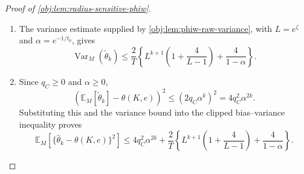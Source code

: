 \begin{proof}[Proof of \cref{obj:lem:radius-sensitive-phiw}]
\begin{enumerate}
\[
\theta(K,e)
=
\sum_s d_e(s)g_e(s)
=
\sum_s d_e(s)g_e^\circ(s).
\]
By the meaning of the target-policy stationary law used in \cref{obj:def:target-value}, \(d_e\) is invariant for \(P_e\).  Thus, for every function \(r_{\mathrm{test}}:\mathcal S\to\mathbb R\) and every integer \(m\ge0\),
\[
\sum_s d_e(s)r_{\mathrm{test}}(s)
=
\sum_s d_e(s)(P_e^m r_{\mathrm{test}})(s).
\]
Applying this identity with \(r_{\mathrm{test}}=g_e^\circ\) and \(m=k\) yields
\[
\sum_s d_e(s)g_e^\circ(s)
=
\sum_s d_e(s)\Psi_k(s).
\]
Combining the preceding displays,
\[
\mathbb E_M[\widetilde\theta_k]-\theta(K,e)
=
\sum_s \{d_b(s)-d_e(s)\}\Psi_k(s).
\]
For any function with oscillation at most \(2\alpha^k\),
\[
\left|
\sum_s \{d_b(s)-d_e(s)\}\Psi_k(s)
\right|
\le
2\alpha^k\,\|d_b-d_e\|_{\mathrm{TV}}.
\]
It remains to prove the stationary-law distance subclaim
\[
\|d_b-d_e\|_{\mathrm{TV}}\le q_C.
\]
This subclaim uses the pointwise comparison \(d_e(s)\le C d_b(s)\) from \cref{obj:ass:latent-stationary-overlap}.  Throughout this step,
\[
\|\mu-\eta\|_{\mathrm{TV}}
:=
\frac12\sum_{s\in\mathcal S}|\mu(s)-\eta(s)|
=
\sup_{B\subseteq\mathcal S}|\mu(B)-\eta(B)|
\]
for probability laws on the finite joint-state space.  With this convention, any two probability laws have total-variation distance at most \(1\), since
\[
\frac12\sum_s |\mu(s)-\eta(s)|
\le
\frac12\sum_s\{\mu(s)+\eta(s)\}=1.
\]
If \(C=1\), then \(d_e(s)\le d_b(s)\) for every \(s\), and the two probability laws have equal total mass, so \(d_b=d_e\).  Hence
\[
\|d_b-d_e\|_{\mathrm{TV}}=0=q_C.
\]
If \(C>1\), define
\[
\eta_C(s):=\frac{C d_b(s)-d_e(s)}{C-1},\qquad s\in\mathcal S .
\]
The latent stationary overlap condition gives \(C d_b(s)-d_e(s)\ge0\) for every \(s\), and
\[
\sum_s \eta_C(s)
=
\frac{C\sum_s d_b(s)-\sum_s d_e(s)}{C-1}
=
1,
\]
so \(\eta_C\) is a probability law.  The identity
\[
d_b=\frac1C d_e+q_C\eta_C,
\qquad q_C=\frac{C-1}{C},
\]
then gives
\[
d_b-d_e
=
q_C(\eta_C-d_e).
\]
Therefore
\[
\|d_b-d_e\|_{\mathrm{TV}}
=
q_C\|\eta_C-d_e\|_{\mathrm{TV}}
\le q_C.
\]
Thus in all cases,
\[
\left|
\mathbb E_M[\widetilde\theta_k]-\theta(K,e)
\right|
\le
2q_C\alpha^k .
\] %

\item
The variance estimate supplied by \cref{obj:lem:phiw-raw-variance}, with \(L=e^\zeta\) and \(\alpha=e^{-1/t_0}\), gives
\[
\operatorname{Var}_M(\widetilde\theta_k)
\le
\frac{2}{T}\left\{
L^{k+1}\left(1+\frac{4}{L-1}\right)
+
\frac{4}{1-\alpha}
\right\}.
\] %

\item
Since \(q_C\ge 0\) and \(\alpha\ge 0\),
\[
\left(
\mathbb E_M[\widetilde\theta_k]-\theta(K,e)
\right)^2
\le
(2q_C\alpha^k)^2
=
4q_C^2\alpha^{2k}.
\]
Substituting this and the variance bound into the clipped bias--variance inequality proves
\[
\mathbb E_M\!\left[\{\widehat\theta_k-\theta(K,e)\}^2\right]
\le
4q_C^2\alpha^{2k}
+\frac{2}{T}\left\{
L^{k+1}\left(1+\frac{4}{L-1}\right)
+\frac{4}{1-\alpha}
\right\}.
\] %
\end{enumerate}
\end{proof}
